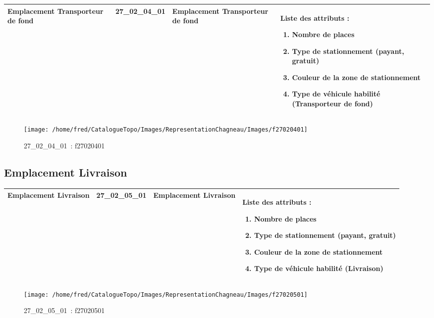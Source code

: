 \documentclass[12pt,titlepage]{book}
\begin{document}
\renewcommand{\arraystretch}{1.2}
\begin{supertabular}{|p{10cm}|c|p{13cm}|p{12cm}|}
 Emplacement Transporteur de fond & 27\_02\_04\_01 & Emplacement Transporteur de fond & Liste des attributs :
\begin{enumerate}
  \item Nombre de places  \item Type de stationnement (payant, gratuit)  \item Couleur de la zone de stationnement  \item Type de véhicule habilité (Transporteur de fond)\end{enumerate}
\\
\hline
\end{supertabular}
\begin{figure}[h!]
  \hfill         %
  \begin{minipage}[t]{3cm}
    \begin{center}
      \texttt{[image: /home/fred/CatalogueTopo/Images/RepresentationChagneau/Images/f27020401]}
      \caption[~27\_02\_04\_01]{\small{27\_02\_04\_01~:} \tiny{f27020401}}\label{f27020401}
    \end{center}
  \end{minipage}
\end{figure}


\subsection{Emplacement Livraison}
\noindent
\vspace{\baselineskip}

\renewcommand{\arraystretch}{1.2}
\begin{supertabular}{|p{10cm}|c|p{13cm}|p{12cm}|}
 Emplacement Livraison & 27\_02\_05\_01 & Emplacement Livraison & Liste des attributs :
\begin{enumerate}
  \item Nombre de places  \item Type de stationnement (payant, gratuit)  \item Couleur de la zone de stationnement  \item Type de véhicule habilité (Livraison)\end{enumerate}
\\
\hline
\end{supertabular}
\begin{figure}[h!]
  \hfill         %
  \begin{minipage}[t]{3cm}
    \begin{center}
      \texttt{[image: /home/fred/CatalogueTopo/Images/RepresentationChagneau/Images/f27020501]}
      \caption[~27\_02\_05\_01]{\small{27\_02\_05\_01~:} \tiny{f27020501}}\label{f27020501}
    \end{center}
  \end{minipage}
\end{figure}
\end{document}
